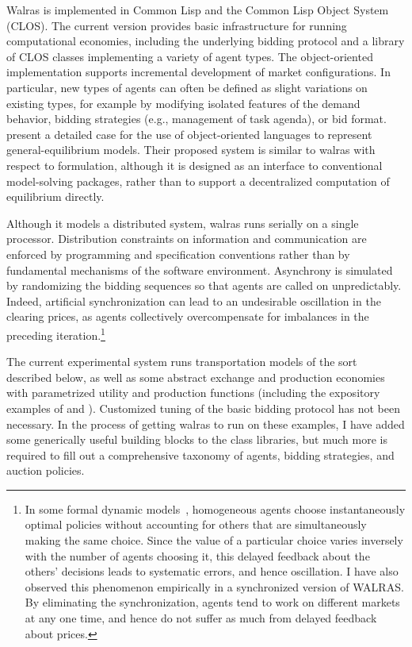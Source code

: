 {\sc Walras} is implemented in Common Lisp and the Common Lisp Object 
System (CLOS).  The current version provides basic infrastructure for 
running computational economies, including the underlying bidding 
protocol and a library of CLOS classes implementing a variety of agent 
types.
The object-oriented implementation supports incremental development of 
market configurations.  In particular, new types of agents can often be 
defined as slight variations on existing types, for example by modifying 
isolated features of the demand behavior, bidding strategies (e.g., 
management of task agenda), or bid format.   
present a detailed case for the use of object-oriented languages to 
represent general-equilibrium models.  Their proposed system is similar 
to {\sc walras} with respect to formulation, although it is
designed as an interface to conventional model-solving packages, rather 
than to support a decentralized computation of equilibrium directly.

Although it models a distributed system, {\sc walras} runs serially
on a single processor.
Distribution constraints on information and communication are enforced
by programming and specification conventions rather than by fundamental
mechanisms of the software environment.
Asynchrony is simulated by randomizing the  
bidding sequences so that agents are called on unpredictably.
Indeed, artificial synchronization can lead to an undesirable oscillation 
in the clearing prices, as agents collectively overcompensate for 
imbalances in the preceding iteration.\footnote{In some formal dynamic 
models~\cite{Huberman88,Kephart89}, homogeneous
agents choose instantaneously optimal policies without accounting for
others that are simultaneously making the same choice.  Since the value 
of a particular choice varies inversely with the number of agents 
choosing it, this delayed feedback about the others' decisions leads to 
systematic errors, and hence oscillation.
I have also observed this phenomenon empirically in a synchronized version of 
WALRAS\@.
By eliminating the synchronization, agents tend to work on 
different markets at any one time, and hence do not suffer as much from 
delayed feedback about prices.}

The current experimental system runs 
transportation models of the sort described below,
as well as some abstract exchange and production economies with parametrized
utility and production functions (including the expository examples of 
 and ).
Customized tuning of the basic bidding protocol has not been necessary.
In the process of getting {\sc walras} to run on these examples, I have 
added some generically useful building blocks to the class libraries, but much
more is required to fill out a comprehensive taxonomy of agents, bidding 
strategies, and auction policies.

